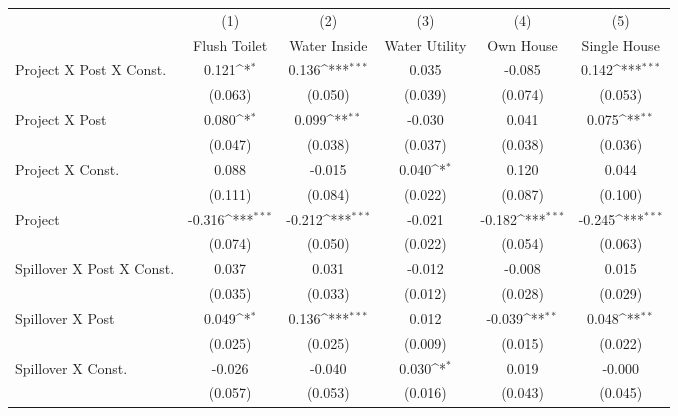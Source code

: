 {
\def\sym#1{\ifmmode^{#1}\else\(^{#1}\)\fi}
\begin{tabular}{l*{5}{c}}
\hline\hline
                &\multicolumn{1}{c}{(1)}&\multicolumn{1}{c}{(2)}&\multicolumn{1}{c}{(3)}&\multicolumn{1}{c}{(4)}&\multicolumn{1}{c}{(5)}\\
                &\multicolumn{1}{c}{Flush Toilet}&\multicolumn{1}{c}{Water Inside}&\multicolumn{1}{c}{Water Utility}&\multicolumn{1}{c}{Own House}&\multicolumn{1}{c}{Single House}\\
\hline
Project X Post X Const.&    0.121\sym{*}  &    0.136\sym{***}&    0.035         &   -0.085         &    0.142\sym{***}\\
                &  (0.063)         &  (0.050)         &  (0.039)         &  (0.074)         &  (0.053)         \\
[1em]
Project X Post  &    0.080\sym{*}  &    0.099\sym{**} &   -0.030         &    0.041         &    0.075\sym{**} \\
                &  (0.047)         &  (0.038)         &  (0.037)         &  (0.038)         &  (0.036)         \\
[1em]
Project X Const.&    0.088         &   -0.015         &    0.040\sym{*}  &    0.120         &    0.044         \\
                &  (0.111)         &  (0.084)         &  (0.022)         &  (0.087)         &  (0.100)         \\
[1em]
Project         &   -0.316\sym{***}&   -0.212\sym{***}&   -0.021         &   -0.182\sym{***}&   -0.245\sym{***}\\
                &  (0.074)         &  (0.050)         &  (0.022)         &  (0.054)         &  (0.063)         \\
[1em]
Spillover X Post X Const.&    0.037         &    0.031         &   -0.012         &   -0.008         &    0.015         \\
                &  (0.035)         &  (0.033)         &  (0.012)         &  (0.028)         &  (0.029)         \\
[1em]
Spillover X Post&    0.049\sym{*}  &    0.136\sym{***}&    0.012         &   -0.039\sym{**} &    0.048\sym{**} \\
                &  (0.025)         &  (0.025)         &  (0.009)         &  (0.015)         &  (0.022)         \\
[1em]
Spillover X Const.&   -0.026         &   -0.040         &    0.030\sym{*}  &    0.019         &   -0.000         \\
                &  (0.057)         &  (0.053)         &  (0.016)         &  (0.043)         &  (0.045)         \\

\end{tabular}}

